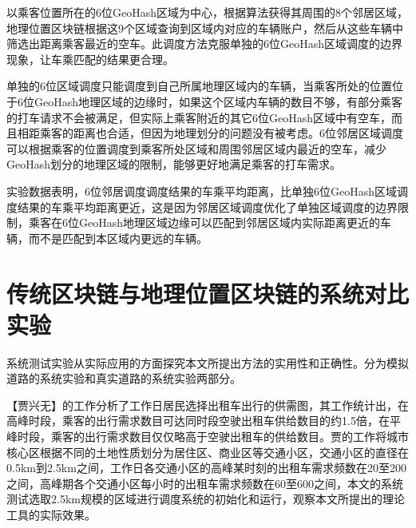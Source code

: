 



以乘客位置所在的6位GeoHash区域为中心，根据算法获得其周围的8个邻居区域，地理位置区块链根据这9个区域查询到区域内对应的车辆账户，然后从这些车辆中筛选出距离乘客最近的空车。此调度方法克服单独的6位GeoHash区域调度的边界现象，让车乘匹配的结果更合理。

单独的6位区域调度只能调度到自己所属地理区域内的车辆，当乘客所处的位置位于6位GeoHash地理区域的边缘时，如果这个区域内车辆的数目不够，有部分乘客的打车请求不会被满足，但实际上乘客附近的其它6位GeoHash区域中有空车，而且相距乘客的距离也合适，但因为地理划分的问题没有被考虑。6位邻居区域调度可以根据乘客的位置调度到乘客所处区域和周围邻居区域内最近的空车，减少GeoHash划分的地理区域的限制，能够更好地满足乘客的打车需求。

实验数据表明，6位邻居调度调度结果的车乘平均距离，比单独6位GeoHash区域调度结果的车乘平均距离更近，这是因为邻居区域调度优化了单独区域调度的边界限制，乘客在6位GeoHash地理区域边缘可以匹配到邻居区域内实际距离更近的车辆，而不是匹配到本区域内更远的车辆。



\section{传统区块链与地理位置区块链的系统对比实验}

系统测试实验从实际应用的方面探究本文所提出方法的实用性和正确性。分为模拟道路的系统实验和真实道路的系统实验两部分。

【贾兴无】的工作分析了工作日居民选择出租车出行的供需图，其工作统计出，在高峰时段，乘客的出行需求数目可达同时段空驶出租车供给数目的约1.5倍，在平峰时段，乘客的出行需求数目仅仅略高于空驶出租车的供给数目。贾的工作将城市核心区根据不同的土地性质划分为居住区、商业区等交通小区，交通小区的直径在0.5km到2.5km之间，工作日各交通小区的高峰某时刻的出租车需求频数在20至200之间，高峰期各个交通小区每小时的出租车需求频数在60至600之间，本文的系统测试选取2.5km规模的区域进行调度系统的初始化和运行，观察本文所提出的理论工具的实际效果。

